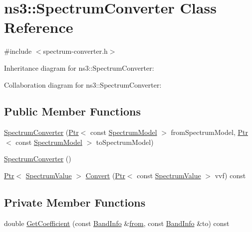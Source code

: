 \hypertarget{classns3_1_1SpectrumConverter}{}\section{ns3\+:\+:Spectrum\+Converter Class Reference}
\label{classns3_1_1SpectrumConverter}


{\ttfamily \#include $<$spectrum-\/converter.\+h$>$}



Inheritance diagram for ns3\+:\+:Spectrum\+Converter\+:


Collaboration diagram for ns3\+:\+:Spectrum\+Converter\+:
\subsection*{Public Member Functions}
\begin{DoxyCompactItemize}
\item 
\hyperlink{classns3_1_1SpectrumConverter_a1e759b343b89a981e3b774ed15aacdad}{Spectrum\+Converter} (\hyperlink{classns3_1_1Ptr}{Ptr}$<$ const \hyperlink{classns3_1_1SpectrumModel}{Spectrum\+Model} $>$ from\+Spectrum\+Model, \hyperlink{classns3_1_1Ptr}{Ptr}$<$ const \hyperlink{classns3_1_1SpectrumModel}{Spectrum\+Model} $>$ to\+Spectrum\+Model)
\item 
\hyperlink{classns3_1_1SpectrumConverter_a9958e1755d368f231debab339d285d38}{Spectrum\+Converter} ()
\item 
\hyperlink{classns3_1_1Ptr}{Ptr}$<$ \hyperlink{classns3_1_1SpectrumValue}{Spectrum\+Value} $>$ \hyperlink{classns3_1_1SpectrumConverter_a3d418000b698858a71c164ef887b8185}{Convert} (\hyperlink{classns3_1_1Ptr}{Ptr}$<$ const \hyperlink{classns3_1_1SpectrumValue}{Spectrum\+Value} $>$ vvf) const 
\end{DoxyCompactItemize}
\subsection*{Private Member Functions}
\begin{DoxyCompactItemize}
\item 
double \hyperlink{classns3_1_1SpectrumConverter_aebdde6358be5ca6824b009f0c54a1dfd}{Get\+Coefficient} (const \hyperlink{structns3_1_1BandInfo}{Band\+Info} \&\hyperlink{lte__amc_8m_a1b4c81ff74eb1a626b5ade44c81004b3}{from}, const \hyperlink{structns3_1_1BandInfo}{Band\+Info} \&to) const 
\end{DoxyCompactItemize}
